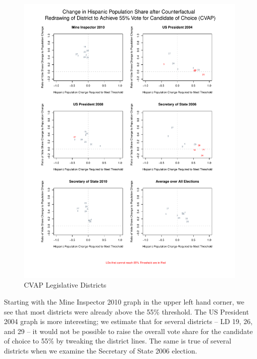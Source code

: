 \documentclass[12pt]{article}
\begin{document}
\begin{figure}[p!h]
\begin{center}
\includegraphics[scale=.8]{figs/cvap_ld_performance_ratio.pdf}
\caption{\label{cvap_ld_performance_ratio}CVAP Legislative Districts}
\end{center}
\end{figure}

Starting with the Mine Inspector 2010 graph in the upper left hand
corner, we see that most districts were already above the 55\%
threshold. The US President 2004 graph is more interesting; we
estimate that for several districts -- LD 19, 26, and 29 -- it would
not be possible to raise the overall vote share for the candidate of
choice to 55\% by tweaking the district lines. The same is true of
several districts when we examine the Secretary of State 2006
election.
\end{document}
